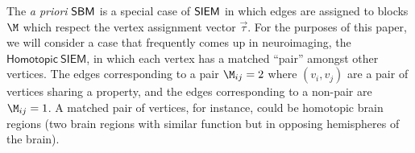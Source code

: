 

The \textit{a priori} $\operatorname{\mathsf{SBM}}$ is a special case of $\operatorname{\mathsf{SIEM}}$ in which edges are assigned to blocks $\M$ which respect the vertex assignment vector $\vec \tau$. For the purposes of this paper, we will consider a case that frequently comes up in neuroimaging, the $\mathsf{Homotopic~ SIEM}$, in which each vertex has a matched ``pair'' amongst other vertices. The edges corresponding to a pair $\M_{ij} = 2$ where $(v_i, v_j)$ are a pair of vertices sharing a property, and the edges corresponding to a non-pair are $\M_{ij} = 1$. A matched pair of vertices, for instance, could be homotopic brain regions (two brain regions with similar function but in opposing hemispheres of the brain).

